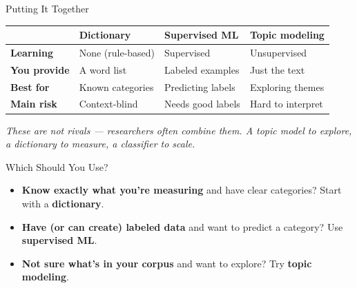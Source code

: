 \documentclass[aspectratio=169]{beamer}
\begin{document}
\begin{frame}{Putting It Together}
\vspace{0.3cm}
\begin{center}
\renewcommand{\arraystretch}{1.5}
{\small
\begin{tabular}{p{2.4cm}|p{2.6cm}p{2.6cm}p{2.6cm}}
 & \textbf{Dictionary} & \textbf{Supervised ML} & \textbf{Topic modeling} \\
\hline
\textbf{Learning} & None (rule-based) & Supervised & Unsupervised \\
\textbf{You provide} & A word list & Labeled examples & Just the text \\
\textbf{Best for} & Known categories & Predicting labels & Exploring themes \\
\textbf{Main risk} & Context-blind & Needs good labels & Hard to interpret \\
\end{tabular}
}
\end{center}

\bigskip
{\small\textcolor{midgray}{\textit{These are not rivals --- researchers often combine them.
A topic model to explore, a dictionary to measure, a classifier to scale.}}}
\end{frame}

\begin{frame}{Which Should You Use?}
\vspace{0.3cm}
\begin{itemize}\setlength\itemsep{10pt}
  \item[\textcolor{wurgreen}{\faArrowRight}]
    \textbf{Know exactly what you're measuring} and have clear categories?
    Start with a \textbf{dictionary}.
  \item[\textcolor{wurgreen}{\faArrowRight}]
    \textbf{Have (or can create) labeled data} and want to predict a category?
    Use \textbf{supervised ML}.
  \item[\textcolor{wurgreen}{\faArrowRight}]
    \textbf{Not sure what's in your corpus} and want to explore?
    Try \textbf{topic modeling}.
\end{itemize}

\bigskip
{}
\end{frame}
\end{document}
